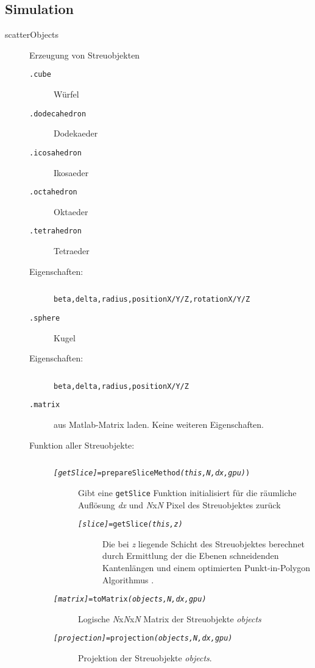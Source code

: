 \subsection*{Simulation}
\begin{description}
	\item[scatterObjects]Erzeugung von Streuobjekten
	\begin{description}
		\item[\texttt{.cube}] Würfel
		\item[\texttt{.dodecahedron}] Dodekaeder
		\item[\texttt{.icosahedron}] Ikosaeder
		\item[\texttt{.octahedron}] Oktaeder
		\item[\texttt{.tetrahedron}] Tetraeder
		\item[\normalfont Eigenschaften:]$ $
		\begin{description}
			\item[\texttt{beta,delta,radius,positionX/Y/Z,rotationX/Y/Z}]
		\end{description}
		
		\item[\texttt{.sphere}] Kugel
		\item[\normalfont Eigenschaften:]$ $
		\begin{description}
			\item[\texttt{beta,delta,radius,positionX/Y/Z}]
		\end{description}
		
		\item[\texttt{.matrix}] aus Matlab-Matrix laden. Keine weiteren Eigenschaften.
		\item[\normalfont Funktion aller Streuobjekte:]$ $
			\begin{description}
				\item[\texttt{\textit{[getSlice]}=prepareSliceMethod\textit{(this,N,dx,gpu)})}] Gibt eine \texttt{getSlice} Funktion initialisiert für die räumliche Auflösung \textit{dx} und \textit{N}x\textit{N} Pixel des Streuobjektes zurück
				\begin{description}
					\item [\texttt{\textit{[slice]}=getSlice\textit{(this,z)}}] Die bei \textit{z} liegende Schicht des Streuobjektes berechnet durch Ermittlung der die Ebenen schneidenden Kantenlängen und einem optimierten Punkt-in-Polygon Algorithmus \cite{pnpoly}.
				\end{description}
				
				\item[\texttt{\textit{[matrix]}=toMatrix\textit{(objects,N,dx,gpu)}}] Logische \textit{N}x\textit{N}x\textit{N} Matrix der Streuobjekte \textit{objects}
				\item[\texttt{\textit{[projection]}=projection\textit{(objects,N,dx,gpu)}}] Projektion der Streuobjekte \textit{objects}.
			\end{description}
	\end{description}	
\end{description}


